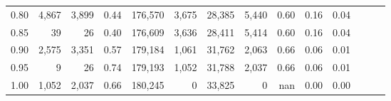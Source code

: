 \begin{tabular}{rrrrrrrrrrrrrr}
0.80 &   4,867 &  3,899 &  0.44 &  176,570 &    3,675 &  28,385 &   5,440 &  0.60 &  0.16 &      0.04 \\
0.85 &      39 &     26 &  0.40 &  176,609 &    3,636 &  28,411 &   5,414 &  0.60 &  0.16 &      0.04 \\
0.90 &   2,575 &  3,351 &  0.57 &  179,184 &    1,061 &  31,762 &   2,063 &  0.66 &  0.06 &      0.01 \\
0.95 &       9 &     26 &  0.74 &  179,193 &    1,052 &  31,788 &   2,037 &  0.66 &  0.06 &      0.01 \\
1.00 &   1,052 &  2,037 &  0.66 &  180,245 &        0 &  33,825 &       0 &   nan &  0.00 &      0.00 \\
\bottomrule
\end{tabular}
